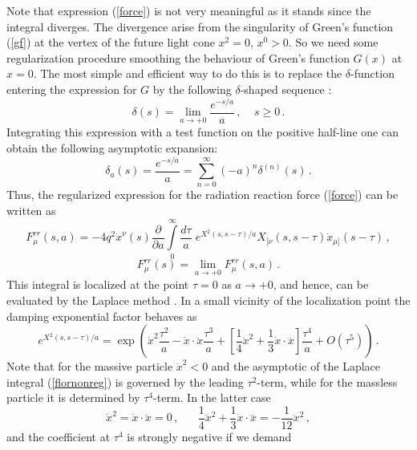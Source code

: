\documentclass[a4paper,12pt]{article}
\begin{document}
Note that expression (\ref{force}) is not very meaningful as it
stands since the integral diverges. The divergence arise from the
singularity of Green's function (\ref{gf}) at the vertex of the
future light cone $x^2=0$, $x^0>0$. So we need some
regularization procedure smoothing the behaviour of Green's
function $G(x)$ at $x=0$. The most simple and efficient way to do
this is to replace the $\delta$-function entering the expression
for $G$ by the following $\delta$-shaped sequence \cite{KLS}:
\begin{equation}\label{reg}
\delta(s)=\lim_{a\rightarrow +0}\frac{e^{-s/a}}{a}\,,\;\;\;\;s\geq
0\,.
\end{equation}
Integrating this expression  with a test function on the positive
half-line one can obtain the following asymptotic expansion:
\begin{equation} \delta_a(s)=\frac{e^{-
s/a}}{a}=\sum_{n=0}^{\infty}(-a)^n\delta^{(n)}(s)\,.
\end{equation}
Thus, the regularized expression for the radiation reaction force
(\ref{force}) can be written as
\begin{equation}\label{flornonreg}
F^{rr}_\mu(s,a)=-4q^2\dot{x}^\nu (s)\frac \partial {\partial
a}\int\limits_0^\infty \frac{d\tau}{a}\;{ e^{X^2(s,s-\tau)/a}}
X_{[\nu}(s,s-\tau)\dot{x}_{\mu] }(s-\tau ) \,,
\end{equation}
\begin{equation*}
F^{rr}_\mu (s)=\lim_{a\rightarrow +0}F^{rr}_\mu(s,a)\,.
\end{equation*}
This integral is localized at the point $\tau=0$ as $a\rightarrow
+0$, and hence, can be evaluated by the Laplace method \cite{GS}.
In a small vicinity of the localization point the damping
exponential factor behaves as
\begin{equation}\label{exp}
e^{X^2(s,s-\tau)/a}=\exp\left(\dot{x}^2\frac{\tau^2}a-\dot
x\cdot\ddot x \frac {\tau ^3}a+\left[\frac 14\ddot{x}^2+\frac13
\dot x\cdot\dddot x \right]\frac{\tau ^4}a+O(\tau^5) \right)\,.
\end{equation}
Note that for the massive particle  $\dot{x}^2 < 0$ and the
asymptotic of the Laplace integral (\ref{flornonreg}) is governed
by the leading $\tau^2$-term, while for the massless particle it
is determined by $\tau^4$-term. In the latter case
\begin{equation}
\dot{x}^2=\dot{x}\cdot\ddot{x}=0\,,\;\;\;\;\;\;
\frac14\ddot{x}^2+\frac13\dot{x}\cdot\dddot{x} =
-\frac{1}{12}\ddot{x}^2\,,
\end{equation}
and the coefficient at $\tau^4$ is strongly negative if we demand
\end{document}
